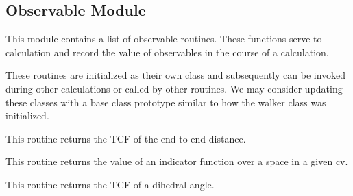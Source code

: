 \documentclass[letterpaper,10pt,english]{sphinxmanual}
\begin{document}
\subsection{Observable Module}
\label{applications/applications.doc:module-observables}\label{applications/applications.doc:observable-module}
This module contains a list of observable routines. These functions serve to calculation and record the value of observables in the course of a calculation.

These routines are initialized as their own class and subsequently can be invoked during other calculations or called by other routines. We may consider updating these classes with a base class prototype similar to how the walker class was initialized.

\begin{fulllineitems}
\label{applications/applications.doc:observables.P1}
This routine returns the TCF of the end to end distance.

\end{fulllineitems}


\begin{fulllineitems}
\label{applications/applications.doc:observables.cv_indicator_correlation}
This routine returns the value of an indicator function over a space in a given cv.

\end{fulllineitems}


\begin{fulllineitems}
\label{applications/applications.doc:observables.dihedral_fluctuation_correlation}
This routine returns the TCF of a dihedral angle.

\end{fulllineitems}
\end{document}
